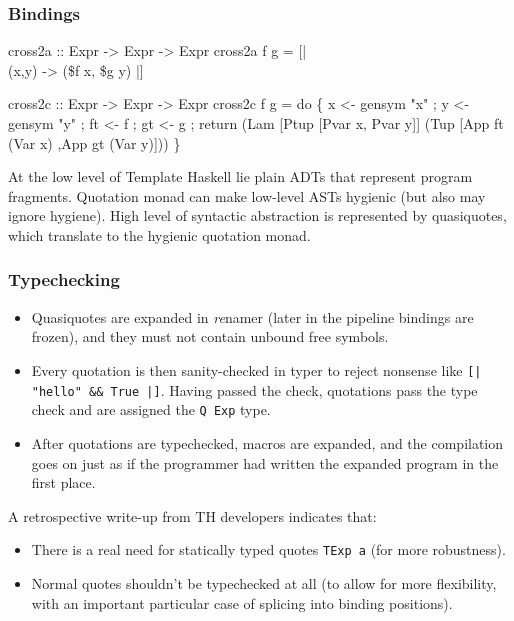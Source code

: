 \documentclass[hyperref={bookmarks=false}]{beamer}
\begin{document}
\begin{frame}[fragile]
\frametitle{Bindings}

\begin{lstlistinglike}
\begin{semiverbatim}
cross2a :: Expr -> Expr -> Expr
cross2a f g = [| \\(x,y) -> (\$f x, \$g y) |]

cross2c :: Expr -> Expr -> Expr
cross2c f g =
  do \{ x <- gensym "x"
     ; y <- gensym "y"
     ; ft <- f
     ; gt <- g
     ; return (Lam [Ptup [Pvar x, Pvar y]]
                   (Tup  [App ft (Var x)
                         ,App gt (Var y)]))
     \}
\end{semiverbatim}
\end{lstlistinglike}

At the low level of Template Haskell lie plain ADTs that represent program fragments.
Quotation monad can make low-level ASTs hygienic (but also may ignore hygiene).
High level of syntactic abstraction is represented by quasiquotes, which translate to
the hygienic quotation monad.
\end{frame}

\begin{frame}[fragile]
\frametitle{Typechecking}

\begin{itemize}
\item Quasiquotes are expanded in \emph{re}namer (later in the pipeline bindings are frozen),
and they must not contain unbound free symbols.
\item Every quotation is then sanity-checked in typer to reject nonsense like \texttt{[| "hello" \&\& True |]}.
Having passed the check, quotations pass the type check and are assigned the \texttt{Q Exp} type.
\item After quotations are typechecked, macros are expanded, and the compilation goes on just
as if the programmer had written the expanded program in the first place.
\end{itemize}

A retrospective write-up from TH developers indicates that:
\begin{itemize}
\item There is a real need for statically typed quotes \texttt{TExp a} (for more robustness).
\item Normal quotes shouldn't be typechecked at all (to allow for more flexibility, with an important
particular case of splicing into binding positions).
\end{itemize}
\end{frame}
\end{document}
